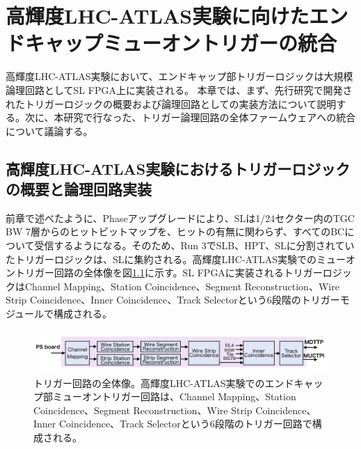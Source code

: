 \chapter{高輝度LHC-ATLAS実験に向けたエンドキャップミューオントリガーの統合}
\label{chap_TriggerIntegration}
高輝度LHC-ATLAS実験において、エンドキャップ部トリガーロジックは大規模論理回路としてSL FPGA上に実装される。
本章では、まず、先行研究で開発されたトリガーロジックの概要および論理回路としての実装方法について説明する。次に、本研究で行なった、トリガー論理回路の全体ファームウェアへの統合について議論する。

\section{高輝度LHC-ATLAS実験におけるトリガーロジックの概要と論理回路実装}
\label{sec_Phase2TriggerLogic}
前章で述べたように、Phase\two アップグレードにより、SLは1/24セクター内のTGC BW 7層からのヒットビットマップを、ヒットの有無に関わらず、すべてのBCについて受信するようになる。そのため、Run 3でSLB、HPT、SLに分割されていたトリガーロジックは、SLに集約される。高輝度LHC-ATLAS実験でのミューオントリガー回路の全体像を図\ref{Trigger_over}に示す。SL FPGAに実装されるトリガーロジックはChannel Mapping、Station Coincidence、Segment Reconstruction、Wire Strip Coincidence、Inner Coincidence、Track Selectorという6段階のトリガーモジュールで構成される。

\begin{figure} 
\centering
\includegraphics[width=16cm]{fig/SL/Trigger_over.png}
\caption[トリガー回路の全体像]{トリガー回路の全体像。高輝度LHC-ATLAS実験でのエンドキャップ部ミューオントリガー回路は、Channel Mapping、Station Coincidence、Segment Reconstruction、Wire Strip Coincidence、Inner Coincidence、Track Selectorという6段階のトリガー回路で構成される。}
\label{Trigger_over}
\end{figure}

